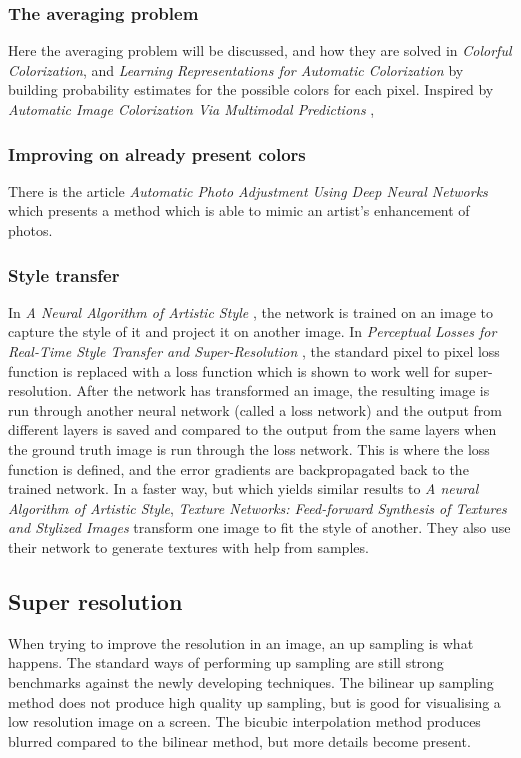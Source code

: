 \subsubsection{The averaging problem}\label{Averaging-problem}
Here the averaging problem will be discussed, and how they are solved in \emph{Colorful Colorization}, and \emph{Learning Representations for Automatic Colorization} by building probability estimates for the possible colors for each pixel. Inspired by \emph{Automatic Image Colorization Via Multimodal Predictions} \citep{Multimodal2008}, 

\subsubsection{Improving on already present colors}
There is the article \emph{Automatic Photo Adjustment Using Deep Neural Networks} \citep{Automatic-adjustment} which presents a method which is able to mimic an artist's enhancement of photos.

\subsubsection{Style transfer}
In \emph{A Neural Algorithm of Artistic Style} \citep{Gatys}, the network is trained on an image to capture the style of it and project it on another image. 
In \emph{Perceptual Losses for Real-Time Style Transfer and Super-Resolution} \citep{Perceptual-losses}, the standard pixel to pixel loss function is replaced with a loss function which is shown to work well for super-resolution. After the network has transformed an image, the resulting image is run through another neural network (called a loss network) and the output from different layers is saved and compared to the output from the same layers when the ground truth image is run through the loss network. This is where the loss function is defined, and the error gradients are backpropagated back to the trained network. In a faster way, but which yields similar results to \emph{A neural Algorithm of Artistic Style}, \emph{Texture Networks: Feed-forward Synthesis of Textures and Stylized Images} \citep{Texture-net} transform one image to fit the style of another. They also use their network to generate textures with help from samples. 

\subsection{Super resolution}
When trying to improve the resolution in an image, an up sampling is what happens. The standard ways of performing up sampling are still strong benchmarks against the newly developing techniques. The bilinear up sampling method does not produce high quality up sampling, but is good for visualising a low resolution image on a screen. The bicubic interpolation method produces blurred compared to the bilinear method, but more details become present. 

